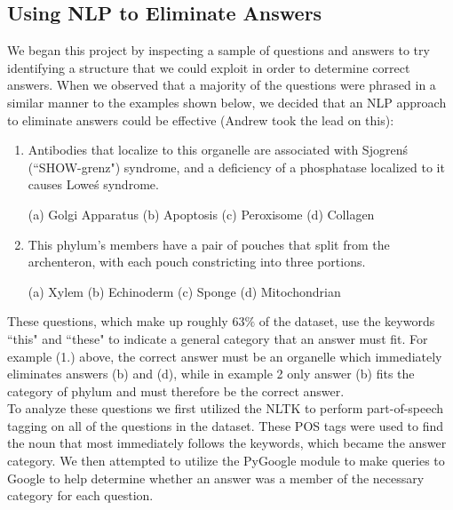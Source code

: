 \documentclass{article}
\theoremstyle{mystuff}
\theoremstyle{myexample}
\theoremstyle{named}
\begin{document}

\subsection{Using NLP to Eliminate Answers}
We began this project by inspecting a sample of questions and answers to try identifying a structure that we could exploit in order to determine correct answers. When we observed that a majority of the questions were phrased in a similar manner to the examples shown below, we decided that an NLP approach to eliminate answers could be effective (Andrew took the lead on this):

\begin{enumerate}
      \item Antibodies that localize to {\color{red}this} {\color{green}organelle} are associated with Sjogren\'s (``SHOW-grenz") syndrome, and a deficiency of a phosphatase localized to it causes Lowe\'s syndrome.

	(a) {\color{green}Golgi Apparatus} (b) Apoptosis (c) {\color{green}Peroxisome} (d) Collagen

      \item {\color{red}This} {\color{green}phylum's} members have a pair of pouches that split from the archenteron, with each pouch constricting into three portions. 

	(a) Xylem (b) {\color{green}Echinoderm} (c) Sponge (d) Mitochondrian
\end{enumerate} 

These questions, which make up roughly 63$\%$ of the dataset, use the keywords ``this" and ``these" to indicate a general category that an answer must fit. For example (1.) above, the correct answer must be an organelle which immediately eliminates answers (b) and (d), while in example 2 only answer (b) fits the category of phylum and must therefore be the correct answer. \\

To analyze these questions we first utilized the NLTK to  perform part-of-speech tagging on all of the questions in the dataset. These POS tags were used to find the noun that most immediately follows the keywords, which became the answer category. We then attempted to utilize the PyGoogle module to make queries to Google to help determine whether an answer was a member of the necessary category for each question. \\
\end{document}
